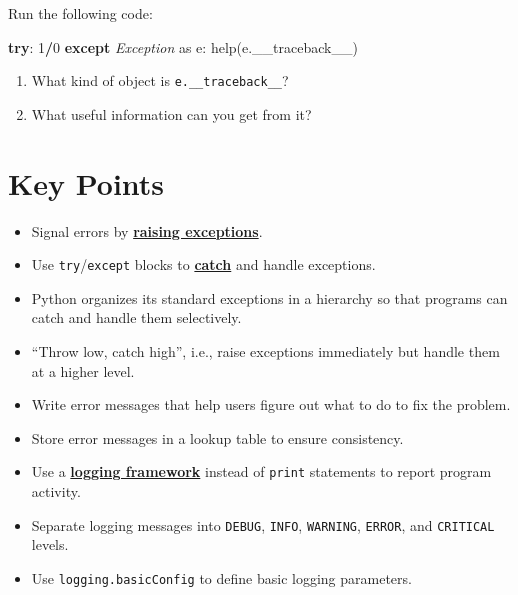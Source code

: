 \documentclass[
]{krantz}
\makeatletter
\newenvironment{Shaded}{\begin{snugshade}}{\end{snugshade}}
\newcommand{\BuiltInTok}[1]{#1}
\newcommand{\ControlFlowTok}[1]{\textcolor[rgb]{0.13,0.29,0.53}{\textbf{#1}}}
\newcommand{\DecValTok}[1]{\textcolor[rgb]{0.00,0.00,0.81}{#1}}
\newcommand{\ImportTok}[1]{#1}
\newcommand{\NormalTok}[1]{#1}
\newcommand{\OperatorTok}[1]{\textcolor[rgb]{0.81,0.36,0.00}{\textbf{#1}}}
\newcommand{\PreprocessorTok}[1]{\textcolor[rgb]{0.56,0.35,0.01}{\textit{#1}}}
\providecommand{\tightlist}{%
  \setlength{\itemsep}{0pt}\setlength{\parskip}{0pt}}
\newenvironment{kframe}{%
\medskip{}
\setlength{\fboxsep}{.8em}
 \def\at@end@of@kframe{}%
 \ifinner\ifhmode%
  \def\at@end@of@kframe{\end{minipage}}%
  \begin{minipage}{\columnwidth}%
 \fi\fi%
 \def\FrameCommand##1{\hskip\@totalleftmargin \hskip-\fboxsep
 \colorbox{shadecolor}{##1}\hskip-\fboxsep
     \hskip-\linewidth \hskip-\@totalleftmargin \hskip\columnwidth}%
 \MakeFramed {\advance\hsize-\width
   \@totalleftmargin\z@ \linewidth\hsize
   \@setminipage}}%
 {\par\unskip\endMakeFramed%
 \at@end@of@kframe}
\renewenvironment{Shaded}{\begin{kframe}}{\end{kframe}}
\newcommand{\gref}[2]{\hyperlink{#2}{\textbf{#1}}}
\makeatother
\begin{document}
Run the following code:

\begin{Shaded}
\begin{Highlighting}[]
\ControlFlowTok{try}\NormalTok{:}
    \DecValTok{1}\OperatorTok{/}\DecValTok{0}
\ControlFlowTok{except} \PreprocessorTok{Exception} \ImportTok{as}\NormalTok{ e:}
    \BuiltInTok{help}\NormalTok{(e.\_\_traceback\_\_)}
\end{Highlighting}
\end{Shaded}

\begin{enumerate}
\def\labelenumi{\arabic{enumi}.}
\tightlist
\item
  What kind of object is \texttt{e.\_\_traceback\_\_}?
\item
  What useful information can you get from it?
\end{enumerate}

\hypertarget{errors-keypoints}{%
\section{Key Points}\label{errors-keypoints}}

\begin{itemize}
\tightlist
\item
  Signal errors by \gref{raising exceptions}{raise\_exception}.
\item
  Use \texttt{try}/\texttt{except} blocks to \gref{catch}{catch\_exception} and handle exceptions.
\item
  Python organizes its standard exceptions in a hierarchy so that programs can catch and handle them selectively.
\item
  ``Throw low, catch high'', i.e., raise exceptions immediately but handle them at a higher level.
\item
  Write error messages that help users figure out what to do to fix the problem.
\item
  Store error messages in a lookup table to ensure consistency.
\item
  Use a \gref{logging framework}{logging\_framework} instead of \texttt{print} statements to report program activity.
\item
  Separate logging messages into \texttt{DEBUG}, \texttt{INFO}, \texttt{WARNING}, \texttt{ERROR}, and \texttt{CRITICAL} levels.
\item
  Use \texttt{logging.basicConfig} to define basic logging parameters.
\end{itemize}
\end{document}
